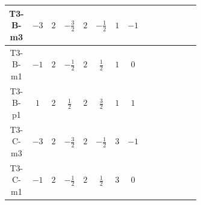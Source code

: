 \documentclass[8pt]{article}
\begin{document}
\begin{landscape}
\begin{longtable}{@{}cccccccc >{\raggedright\arraybackslash}p{0.21\linewidth} >{\raggedright\arraybackslash}p{0.21\linewidth} >{\raggedright\arraybackslash}p{0.21\linewidth}@{}}
\midrule
T3-B-m3 & $-3$ & $2$ & $-\frac{3}{2}$ & $2$ & $-\frac{1}{2}$ & $1$ & $-1$ & \scriptsize\adjustbox{max width=\linewidth}{$\begin{gathered} +D_{\mu _1}\left(S_{2,j_1}\right){}^{\dagger } D_{\mu _1}\left(S_{2,j_1}\right)\end{gathered}$} & \scriptsize\adjustbox{max width=\linewidth}{$\begin{gathered} -\frac{\hbar  B_{\mu _1\mu _2}^2}{\epsilon }\end{gathered}$} &  \\
\midrule
T3-B-m1 & $-1$ & $2$ & $-\frac{1}{2}$ & $2$ & $\frac{1}{2}$ & $1$ & $0$ & \scriptsize\adjustbox{max width=\linewidth}{$\begin{gathered} +D_{\mu _1}\left(S_{2,j_1}\right){}^{\dagger } D_{\mu _1}\left(S_{2,j_1}\right)\end{gathered}$} &  &  \\
\midrule
T3-B-p1 & $1$ & $2$ & $\frac{1}{2}$ & $2$ & $\frac{3}{2}$ & $1$ & $1$ & \scriptsize\adjustbox{max width=\linewidth}{$\begin{gathered} +D_{\mu _1}\left(S_{2,j_1}\right){}^{\dagger } D_{\mu _1}\left(S_{2,j_1}\right)\end{gathered}$} & \scriptsize\adjustbox{max width=\linewidth}{$\begin{gathered} -\frac{\hbar  B_{\mu _1\mu _2}^2}{\epsilon }\end{gathered}$} &  \\
\midrule
T3-C-m3 & $-3$ & $2$ & $-\frac{3}{2}$ & $2$ & $-\frac{1}{2}$ & $3$ & $-1$ & \scriptsize\adjustbox{max width=\linewidth}{$\begin{gathered} +D_{\mu _1}\left(S_{2,j_1}\right){}^{\dagger } D_{\mu _1}\left(S_{2,j_1}\right)\end{gathered}$} & \scriptsize\adjustbox{max width=\linewidth}{$\begin{gathered} -\frac{3 \hbar  B_{\mu _1\mu _2}^2}{\epsilon }\end{gathered}$} & \scriptsize\adjustbox{max width=\linewidth}{$\begin{gathered} -\frac{2 \hbar  \left(W_{\mu _1\mu _2}^{A_1}\right){}^2}{\epsilon }\end{gathered}$} \\
\midrule
T3-C-m1 & $-1$ & $2$ & $-\frac{1}{2}$ & $2$ & $\frac{1}{2}$ & $3$ & $0$ & \scriptsize\adjustbox{max width=\linewidth}{$\begin{gathered} +D_{\mu _1}\left(S_{2,j_1}\right){}^{\dagger } D_{\mu _1}\left(S_{2,j_1}\right)\end{gathered}$} &  & \scriptsize\adjustbox{max width=\linewidth}{$\begin{gathered} -\frac{\hbar  \left(W_{\mu _1\mu _2}^{A_1}\right){}^2}{\epsilon }\end{gathered}$} \\

\end{longtable}
\end{landscape}
\end{document}

